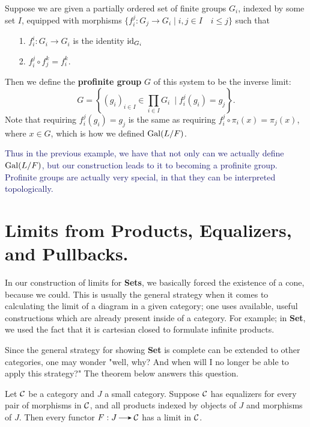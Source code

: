    \begin{definition}
        Suppose we
        are given a partially ordered set of finite groups $G_i$, indexed by some
        set $I$, equipped with morphisms $\{f^j_i: G_j \to G_i \mid i,
        j \in I \quad i \le j\}$ such that 
        \begin{itemize}
            \item[1.] $f_i^i: G_i \to G_i$ is the identity $\operatorname{\mathrm{id}}_{G_i}$ 
            \item[2.] $f_i^j \circ f_j^k = f_i^k$. 
        \end{itemize}
        Then we define the \textbf{profinite group} $G$ 
        of this system to be the inverse limit:
        \[
            G = \left\{(g_i)_{i \in I} \in \prod_{i \in I} G_i \
            \mid f_i^j(g_i) = g_j \right\}.
        \]
        Note that requiring $f_i^j(g_i) = g_j$ is the same as
        requiring $f_i^j\circ \pi_i(x) = \pi_j(x)$, where $x \in G$, 
        which is how we defined $\operatorname{\mathrm{Gal}}(L/F)$. 
    \end{definition}
    \textcolor{MidnightBlue}{Thus in the previous example, we have
    that not only can we actually define $\operatorname{\mathrm{Gal}}(L/F)$, but our construction 
    leads to it to becoming a profinite group. Profinite groups are actually very 
    special, in that they can be interpreted topologically.}

    


    \newpage
    \section{Limits from Products, Equalizers, and Pullbacks.}
    In our construction of limits for \textbf{Sets}, we basically forced 
    the existence of a cone, because we could. This is usually the general strategy 
    when it comes to calculating the limit of a diagram in a given category; 
    one uses available, useful constructions which are already present 
    inside of a category. For example; in \textbf{Set}, we used 
    the fact that it is cartesian closed to formulate infinite products.

    Since the general strategy for showing \textbf{Set} is complete can 
    be extended to other categories, one may wonder "well, why? And when 
    will I no longer be able to apply this strategy?" The theorem 
    below answers this question. 
    
    \begin{thm}\label{products_equalizers_all_limits}
        Let $\mathcal{C}$ be a category and $J$ a small category. 
        Suppose $\mathcal{C}$ has equalizers for every
        pair of morphisms in $\mathcal{C}$, and all products indexed by
        objects of $J$ and morphisms of $J$. Then every functor 
        $F: J \to \cc$ has a limit in $\mathcal{C}$. 
    \end{thm}

